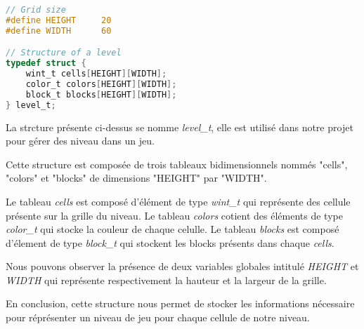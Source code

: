\lstset{style=mystyle}
\begin{lstlisting}[language=C, caption=Structure d'un level]
// Grid size
#define HEIGHT     20
#define WIDTH      60

// Structure of a level
typedef struct {
    wint_t cells[HEIGHT][WIDTH];
    color_t colors[HEIGHT][WIDTH];
    block_t blocks[HEIGHT][WIDTH];
} level_t;
\end{lstlisting}

La strcture présente ci-dessus se nomme \textit{level\_t}, elle est utilisé dans notre projet pour gérer des niveau dans un jeu.

Cette structure est composée de trois tableaux bidimensionnels nommés "cells", "colors" et "blocks" de dimensions "HEIGHT" par "WIDTH".

Le tableau \textit{cells} est composé d'élément de type \textit{wint\_t} qui représente des cellule présente sur la grille du niveau. Le tableau \textit{colors} cotient des éléments de type \textit{color\_t} qui stocke la couleur de chaque celulle. Le tableau \textit{blocks} est composé d'élement de type \textit{block\_t} qui stockent les blocks présents dans chaque \textit{cells}.


Nous pouvons observer la présence de deux variables globales intitulé \textit{HEIGHT} et \textit{WIDTH} qui représente respectivement la hauteur et la largeur de la grille.


En conclusion, cette structure nous permet de stocker les informations nécessaire pour réprésenter un niveau de jeu pour chaque cellule de notre niveau.
\newpage